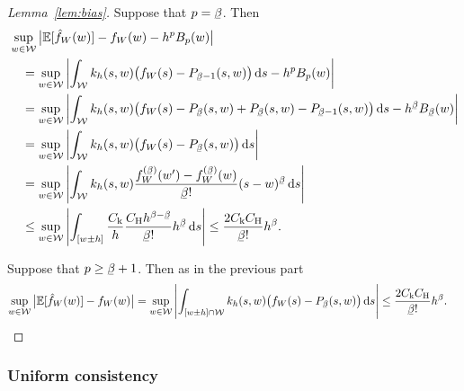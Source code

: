 \begin{proof}[Lemma~\ref{lem:bias}]
  Suppose that $p = \flbeta$.
  Then
  \begin{align*}
    &\sup_{w \in \cW}
    \big|
    \E[\hat f_W(w)]
    - f_W(w)
    - h^p B_p(w)
    \big| \\
    &\quad=
    \sup_{w \in \cW}
    \left|
    \int_{\cW}
    k_h(s,w)
    \big(f_W(s) - P_{\flbeta - 1}(s,w)\big)
    \diff{s}
    - h^p B_p(w)
    \right| \\
    &\quad=
    \sup_{w \in \cW}
    \left|
    \int_{\cW}
    k_h(s,w)
    \big(
      f_W(s) - P_{\flbeta}(s,w)
      + P_{\flbeta}(s,w) - P_{\flbeta - 1}(s,w)
    \big)
    \diff{s}
    - h^{\flbeta} B_{\flbeta}(w)
    \right| \\
    &\quad=
    \sup_{w \in \cW}
    \left|
    \int_{\cW}
    k_h(s,w)
    \big(
      f_W(s) - P_{\flbeta}(s,w)
    \big)
    \diff{s}
    \right| \\
    &\quad=
    \sup_{w \in \cW}
    \left|
    \int_{\cW}
    k_h(s,w)
    \frac{f_W^{(\flbeta)}(w') - f_W^{(\flbeta)}(w)}{\flbeta!}
    (s-w)^{\flbeta}
    \diff{s}
    \right| \\
    &\quad\leq
    \sup_{w \in \cW}
    \left|
    \int_{[w \pm h]}
    \frac{\Ck}{h}
    \frac{\CH h^{\beta - \flbeta}}{\flbeta !}
    h^{\flbeta}
    \diff{s}
    \right|
    \leq
    \frac{2 \Ck \CH}{\flbeta !}
    h^\beta.
  \end{align*}

  Suppose that $p \geq \flbeta+1$.
  Then as in the previous part
  \begin{align*}
    \sup_{w \in \cW}
    \big|
    \E[\hat f_W(w)]
    - f_W(w)
    \big|
    &=
    \sup_{w \in \cW}
    \left|
    \int_{[w \pm h] \cap \cW}
    k_h(s,w)
    \big(
      f_W(s) - P_{\flbeta}(s,w)
    \big)
    \diff{s}
    \right|
    \leq
    \frac{2 \Ck \CH}{\flbeta !}
    h^\beta.
  \end{align*}
\end{proof}

\subsubsection{Uniform consistency}

